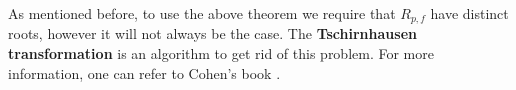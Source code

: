 As mentioned before, to use the above theorem we require that $R_{p,f}$ have distinct roots, however it will not always be the case. The \textbf{Tschirnhausen transformation} is an algorithm to get rid of this problem. For more information, one can refer to Cohen's book \citep{cohen1993course}.






